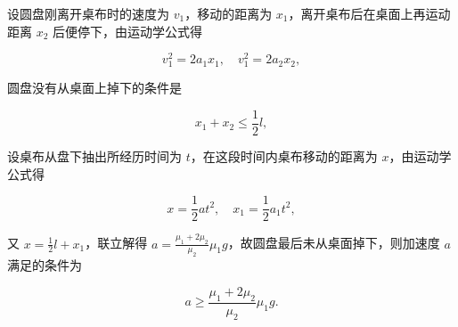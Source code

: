 \documentclass[\gkver]{gaokaozhenti}
\begin{document}
\begin{enumerate}
{	设圆盘刚离开桌布时的速度为 $v_{1}$，移动的距离为 $x_{1}$，离开桌布后在桌面上再运动距离 $x_{2}$ 后便停下，由运动学公式得

	\[ v_{1}^{2}=2a_{1}x_{1},\quad v_{1}^{2}=2a_{2}x_{2}, \]

	圆盘没有从桌面上掉下的条件是

	\[ x_{1}+x_{2}\leq\frac{1}{2}l, \]

	设桌布从盘下抽出所经历时间为 $t$，在这段时间内桌布移动的距离为 $x$，由运动学公式得

	\[ x=\frac{1}{2}at^{2},\quad x_{1}=\frac{1}{2}a_{1}t^{2}, \]

	又 $x=\frac{1}{2}l+x_{1}$，联立解得 $a=\frac{\mu_{1}+2\mu_{2}}{\mu_{2}}\mu_{1}g$，故圆盘最后未从桌面掉下，则加速度 $a$ 满足的条件为

	\[ a\geq\frac{\mu_{1}+2\mu_{2}}{\mu_{2}}\mu_{1}g. \]
}

\end{enumerate}
\end{document}

